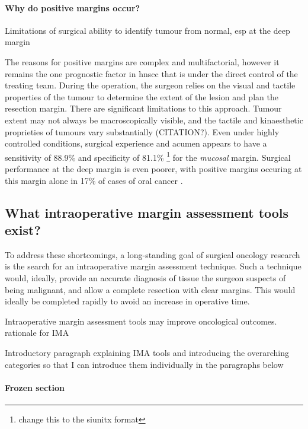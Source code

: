 \paragraph{Why do positive margins occur?}
Limitations of surgical ability to identify tumour from normal, esp at the deep margin


The reasons for positive margins are complex and multifactorial, however it remains the one prognostic factor in \gls{hnscc} that is under the direct control of the treating team.
During the operation, the surgeon relies on the visual and tactile properties of the tumour to determine the extent of the lesion and plan the resection margin.
There are significant limitations to this approach. 
Tumour extent may not always be macroscopically visible, and the tactile and kinaesthetic proprieties of tumours vary substantially (CITATION?).
Even under highly controlled conditions, surgical experience and acumen appears to have a sensitivity of 88.9\% and specificity of 81.1\% \footnote{change this to the siunitx format} \cite{chaturvedip.GrossExaminationSurgeon2014} for the \emph{mucosal} margin.
Surgical performance at the deep margin is even poorer, with positive margins occuring at this margin alone in 17\% of cases of oral cancer \cite{woolgarHistopathologicalAppraisalSurgical2005}.

\subsection{What intraoperative margin assessment tools exist?}

To address these shortcomings, a long-standing goal of surgical oncology research is the search for an intraoperative margin assessment technique.
Such a technique would, ideally, provide an accurate diagnosis of tissue the surgeon suspects of being malignant, and allow a complete resection with clear margins.
This would ideally be completed rapidly to avoid an increase in operative time.


Intraoperative margin assessment tools may improve oncological outcomes.
rationale for IMA

Introductory paragraph explaining IMA tools and introducing the overarching categories so that I can introduce them individually in the paragraphs below

\paragraph{Frozen section}

